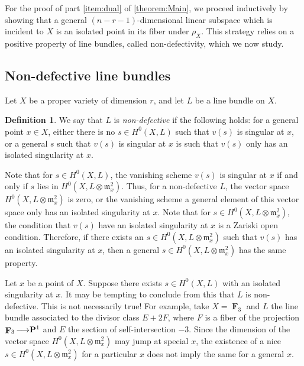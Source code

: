 \documentclass[11pt,reqno]{amsart}
\theoremstyle{plain}
\theoremstyle{definition}
\newtheorem{definition}[theorem]{Definition}
\theoremstyle{remark}
\numberwithin{equation}{section}
\DeclareMathOperator{\F}{\mathbf F}
\renewcommand{\to}{{\longrightarrow}}
\numberwithin{equation}{section}
\begin{document}
For the proof of part \eqref{item:dual} of \autoref{theorem:Main}, we proceed inductively by showing that a general $(n-r-1)$-dimensional linear subspace which is incident to $X$ is an isolated point in its fiber under $\rho_X$.
This strategy relies on a positive property of line bundles, called non-defectivity, which we now study.

\subsection{Non-defective line bundles}\label{sec:non-defectivity}
Let $X$ be a proper variety of dimension $r$, and let $L$ be a line bundle on $X$.
\begin{definition}
  \label{definition:Genericallynon-defective} 
  We say that $L$ is \emph{non-defective} if the following holds: for a general point $x \in X$, either there is no $s \in H^0(X, L)$ such that $v(s)$ is singular at $x$, or a general $s$ such that $v(s)$ is singular at $x$ is such that $v(s)$ only has an isolated singularity at $x$.
\end{definition}
Note that for $s \in H^0(X, L)$, the vanishing scheme $v(s)$ is singular at $x$ if and only if $s$ lies in $H^0(X, L \otimes \mathfrak m_x^2)$.
Thus, for a non-defective $L$, the vector space $H^0(X, L \otimes \mathfrak m_x^2)$ is zero, or the vanishing scheme a general element of this vector space only has an isolated singularity at $x$.
Note that for $s \in H^0(X, L \otimes \mathfrak m_x^2)$, the condition that $v(s)$ have an isolated singularity at $x$ is a Zariski open condition.
Therefore, if there exists an $s \in H^0(X, L \otimes \mathfrak m_x^2)$ such that $v(s)$ has an isolated singularity at $x$, then a general $s \in H^0(X, L \otimes \mathfrak m_x^2)$ has the same property.
\begin{remark}
  Let $x$ be a point of $X$.
  Suppose there exists $s \in H^0(X, L)$ with an isolated singularity at $x$.
  It may be tempting to conclude from this that $L$ is non-defective.
  This is not necessarily true!
  For example, take $X = \F_3$ and $L$ the line bundle associated to the divisor class $E + 2F$, where $F$ is a fiber of the projection $\F_3 \to \P^1$ and $E$ the section of self-intersection $-3$.
  Since the dimension of the vector space $H^0(X, L \otimes \mathfrak m_x^2)$ may jump at special $x$, the existence of a nice $s \in H^0(X, L \otimes \mathfrak m_x^2)$ for a particular $x$ does not imply the same for a general $x$.
\end{remark}
\end{document}
